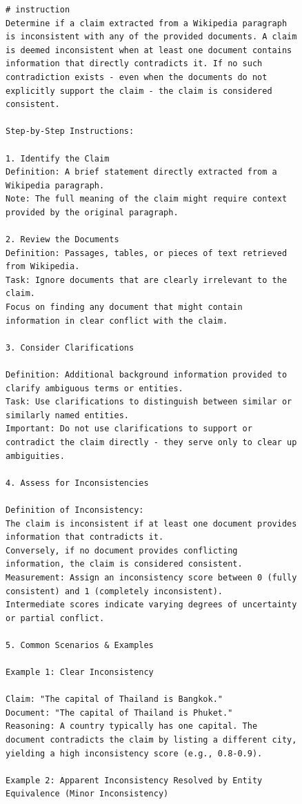 \documentclass[11pt]{article}
\begin{document}
\begin{figure}[htb]
\begin{lstlisting}
# instruction
Determine if a claim extracted from a Wikipedia paragraph is inconsistent with any of the provided documents. A claim is deemed inconsistent when at least one document contains information that directly contradicts it. If no such contradiction exists - even when the documents do not explicitly support the claim - the claim is considered consistent.

Step-by-Step Instructions:

1. Identify the Claim
Definition: A brief statement directly extracted from a Wikipedia paragraph.
Note: The full meaning of the claim might require context provided by the original paragraph.

2. Review the Documents
Definition: Passages, tables, or pieces of text retrieved from Wikipedia.
Task: Ignore documents that are clearly irrelevant to the claim.
Focus on finding any document that might contain information in clear conflict with the claim.

3. Consider Clarifications

Definition: Additional background information provided to clarify ambiguous terms or entities.
Task: Use clarifications to distinguish between similar or similarly named entities.
Important: Do not use clarifications to support or contradict the claim directly - they serve only to clear up ambiguities.

4. Assess for Inconsistencies

Definition of Inconsistency:
The claim is inconsistent if at least one document provides information that contradicts it.
Conversely, if no document provides conflicting information, the claim is considered consistent.
Measurement: Assign an inconsistency score between 0 (fully consistent) and 1 (completely inconsistent).
Intermediate scores indicate varying degrees of uncertainty or partial conflict.

5. Common Scenarios & Examples

Example 1: Clear Inconsistency

Claim: "The capital of Thailand is Bangkok."
Document: "The capital of Thailand is Phuket."
Reasoning: A country typically has one capital. The document contradicts the claim by listing a different city, yielding a high inconsistency score (e.g., 0.8-0.9).

Example 2: Apparent Inconsistency Resolved by Entity Equivalence (Minor Inconsistency)


\end{lstlisting}
\end{figure}
\end{document}
